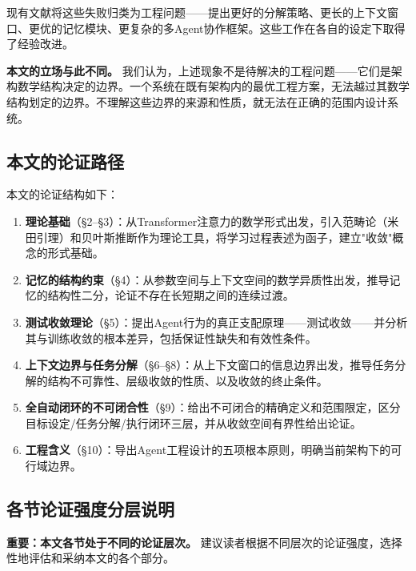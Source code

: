 \documentclass[11pt,a4paper]{ctexart}
\begin{document}
现有文献将这些失败归类为工程问题——提出更好的分解策略\cite{LEAD2025}、更长的上下文窗口、更优的记忆模块\cite{CognitiveMemory2025}、更复杂的多Agent协作框架\cite{MACI2025}。这些工作在各自的设定下取得了经验改进。

\textbf{本文的立场与此不同。} 我们认为，上述现象不是待解决的工程问题——它们是架构数学结构决定的边界。一个系统在既有架构内的最优工程方案，无法越过其数学结构划定的边界。不理解这些边界的来源和性质，就无法在正确的范围内设计系统。

\subsection{本文的论证路径}

本文的论证结构如下：

\begin{enumerate}[leftmargin=*,label=§\arabic*]
    \item \textbf{理论基础}（§2--§3）：从Transformer注意力的数学形式出发，引入范畴论（米田引理）和贝叶斯推断作为理论工具，将学习过程表述为函子，建立"收敛"概念的形式基础。
    \item \textbf{记忆的结构约束}（§4）：从参数空间与上下文空间的数学异质性出发，推导记忆的结构性二分，论证不存在长短期之间的连续过渡。
    \item \textbf{测试收敛理论}（§5）：提出Agent行为的真正支配原理——测试收敛——并分析其与训练收敛的根本差异，包括保证性缺失和有效性条件。
    \item \textbf{上下文边界与任务分解}（§6--§8）：从上下文窗口的信息边界出发，推导任务分解的结构不可靠性、层级收敛的性质、以及收敛的终止条件。
    \item \textbf{全自动闭环的不可闭合性}（§9）：给出不可闭合的精确定义和范围限定，区分目标设定/任务分解/执行闭环三层，并从收敛空间有界性给出论证。
    \item \textbf{工程含义}（§10）：导出Agent工程设计的五项根本原则，明确当前架构下的可行域边界。
\end{enumerate}

\subsection{各节论证强度分层说明}

\textbf{重要：本文各节处于不同的论证层次。} 建议读者根据不同层次的论证强度，选择性地评估和采纳本文的各个部分。
\end{document}
